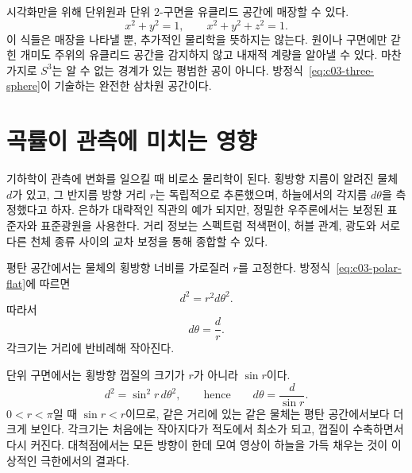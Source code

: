 \begin{classroomqa}\end{classroomqa}

시각화만을 위해 단위원과 단위 \(2\)-구면을 유클리드 공간에 매장할 수 있다.
\begin{equation}
x^2+y^2=1,
\qquad
x^2+y^2+z^2=1.
\end{equation}
이 식들은 매장을 나타낼 뿐, 추가적인 물리학을 뜻하지는 않는다. 원이나 구면에만 갇힌 개미도 주위의 유클리드 공간을 감지하지 않고 내재적 계량을 알아낼 수 있다. 마찬가지로 \(S^3\)는 알 수 없는 경계가 있는 평범한 공이 아니다. 방정식~\eqref{eq:c03-three-sphere}이 기술하는 완전한 삼차원 공간이다.

\section{곡률이 관측에 미치는 영향}

기하학이 관측에 변화를 일으킬 때 비로소 물리학이 된다. 횡방향 지름이 알려진 물체 \(d\)가 있고, 그 반지름 방향 거리 \(r\)는 독립적으로 추론했으며, 하늘에서의 각지름 \(d\theta\)을 측정했다고 하자. 은하가 대략적인 직관의 예가 되지만, 정밀한 우주론에서는 보정된 표준자와 표준광원을 사용한다. 거리 정보는 스펙트럼 적색편이, 허블 관계, 광도와 서로 다른 천체 종류 사이의 교차 보정을 통해 종합할 수 있다.

평탄 공간에서는 물체의 횡방향 너비를 가로질러 \(r\)를 고정한다. 방정식~\eqref{eq:c03-polar-flat}에 따르면
\begin{equation}
d^2 = r^2 d\theta^2.
\label{eq:c03-flat-angle-step}
\end{equation}
따라서
\begin{equation}
d\theta = \frac{d}{r}.
\label{eq:c03-flat-angle}
\end{equation}
각크기는 거리에 반비례해 작아진다.

단위 구면에서는 횡방향 껍질의 크기가 \(r\)가 아니라 \(\sin r\)이다.
\begin{equation}
d^2 = \sin^2 r\, d\theta^2,
\qquad\text{hence}\qquad
d\theta = \frac{d}{\sin r}.
\label{eq:c03-spherical-angle}
\end{equation}
\(0<r<\pi\)일 때 \(\sin r<r\)이므로, 같은 거리에 있는 같은 물체는 평탄 공간에서보다 더 크게 보인다. 각크기는 처음에는 작아지다가 적도에서 최소가 되고, 껍질이 수축하면서 다시 커진다. 대척점에서는 모든 방향이 한데 모여 영상이 하늘을 가득 채우는 것이 이상적인 극한에서의 결과다.

